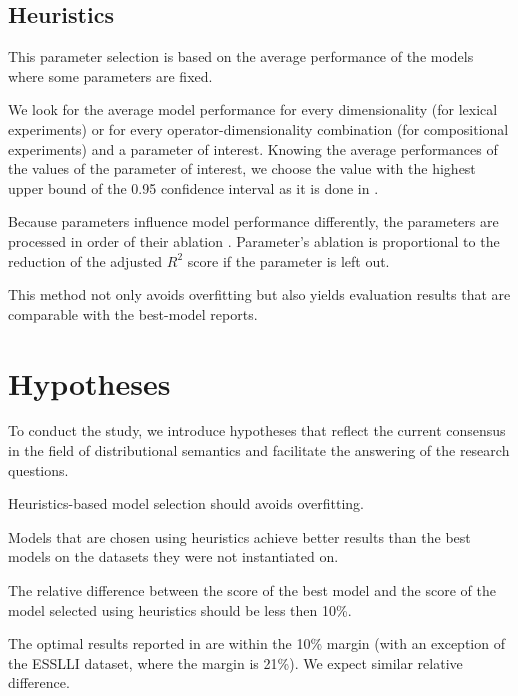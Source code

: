 \subsection{Heuristics}

This parameter selection is based on the average performance of the models where some parameters are fixed.

We look for the average model performance for every dimensionality (for lexical experiments) or for every operator-dimensionality combination (for compositional experiments) and a parameter of interest. Knowing the average performances of the values of the parameter of interest, we choose the value with the highest upper bound of the 0.95 confidence interval as it is done in .

Because parameters influence model performance differently, the parameters are processed in order of their ablation \cite{lapesa2014large}. Parameter's ablation is proportional to the reduction of the adjusted $R^2$ score if the parameter is left out.

This method not only avoids overfitting but also yields evaluation results that are comparable with the best-model reports.

\section{Hypotheses}
\label{sec:hypotheses}

To conduct the study, we introduce hypotheses that reflect the current consensus in the field of distributional semantics and facilitate the answering of the research questions.

\begin{hyp}
\label{hyp:overfitting}
Heuristics-based model selection should avoids overfitting.
\end{hyp}

Models that are chosen using heuristics achieve better results than the best models on the datasets they were not instantiated on.

\begin{hyp}
\label{hyp:10percent}
The relative difference between the score of the best model and the score of the model selected using heuristics should be less then 10\%.
\end{hyp}

The optimal results reported in  are within the 10\% margin (with an exception of the ESSLLI dataset, where the margin is 21\%). We expect similar relative difference.

